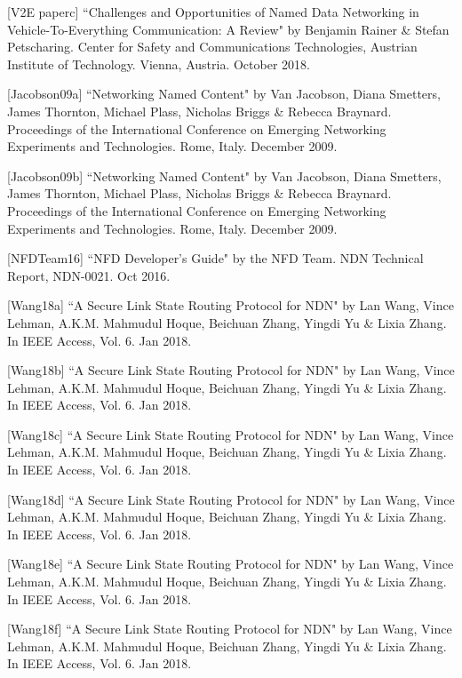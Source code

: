 [V2E paperc] ``Challenges and Opportunities of Named Data Networking in Vehicle-To-Everything Communication: A Review" by Benjamin Rainer \& Stefan Petscharing. Center for Safety and Communications Technologies, Austrian Institute of Technology. Vienna, Austria. October 2018.


[Jacobson09a] ``Networking Named Content" by Van Jacobson, Diana Smetters, James Thornton, Michael Plass, Nicholas Briggs \& Rebecca Braynard. Proceedings of the  International Conference on Emerging Networking Experiments and Technologies. Rome, Italy. December 2009.

[Jacobson09b] ``Networking Named Content" by Van Jacobson, Diana Smetters, James Thornton, Michael Plass, Nicholas Briggs \& Rebecca Braynard. Proceedings of the  International Conference on Emerging Networking Experiments and Technologies. Rome, Italy. December 2009.

[NFDTeam16] ``NFD Developer's Guide" by the NFD Team. NDN Technical Report, NDN-0021. Oct 2016.

[Wang18a] ``A Secure Link State Routing Protocol for NDN" by Lan Wang, Vince Lehman, A.K.M. Mahmudul Hoque, Beichuan Zhang, Yingdi Yu \& Lixia Zhang. In IEEE Access, Vol. 6. Jan 2018.

[Wang18b] ``A Secure Link State Routing Protocol for NDN" by Lan Wang, Vince Lehman, A.K.M. Mahmudul Hoque, Beichuan Zhang, Yingdi Yu \& Lixia Zhang. In IEEE Access, Vol. 6. Jan 2018.


[Wang18c] ``A Secure Link State Routing Protocol for NDN" by Lan Wang, Vince Lehman, A.K.M. Mahmudul Hoque, Beichuan Zhang, Yingdi Yu \& Lixia Zhang. In IEEE Access, Vol. 6. Jan 2018.
 


[Wang18d] ``A Secure Link State Routing Protocol for NDN" by Lan Wang, Vince Lehman, A.K.M. Mahmudul Hoque, Beichuan Zhang, Yingdi Yu \& Lixia Zhang. In IEEE Access, Vol. 6. Jan 2018.
 


[Wang18e] ``A Secure Link State Routing Protocol for NDN" by Lan Wang, Vince Lehman, A.K.M. Mahmudul Hoque, Beichuan Zhang, Yingdi Yu \& Lixia Zhang. In IEEE Access, Vol. 6. Jan 2018.
 

[Wang18f] ``A Secure Link State Routing Protocol for NDN" by Lan Wang, Vince Lehman, A.K.M. Mahmudul Hoque, Beichuan Zhang, Yingdi Yu \& Lixia Zhang. In IEEE Access, Vol. 6. Jan 2018.
 

